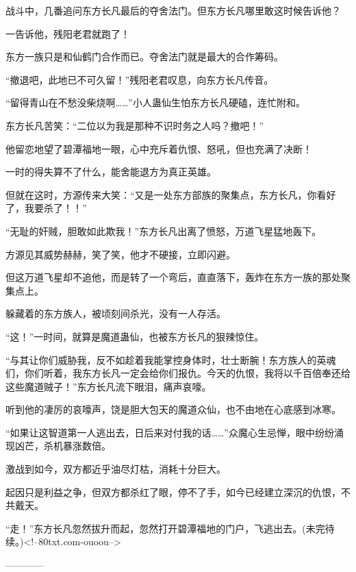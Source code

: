 \begin{this_body}
战斗中，几番追问东方长凡最后的夺舍法门。但东方长凡哪里敢这时候告诉他？

一告诉他，残阳老君就跑了！

东方一族只是和仙鹤门合作而已。夺舍法门就是最大的合作筹码。

“撤退吧，此地已不可久留！”残阳老君叹息，向东方长凡传音。

“留得青山在不愁没柴烧啊……”小人蛊仙生怕东方长凡硬磕，连忙附和。

东方长凡苦笑：“二位以为我是那种不识时务之人吗？撤吧！”

他留恋地望了碧潭福地一眼，心中充斥着仇恨、怒吼，但也充满了决断！

一时的得失算不了什么，能舍能退方为真正英雄。

但就在这时，方源传来大笑：“又是一处东方部族的聚集点，东方长凡，你看好了，我要杀了！！”

“无耻的奸贼，胆敢如此欺我！”东方长凡出离了愤怒，万道飞星猛地轰下。

方源见其威势赫赫，笑了笑，他才不硬接，立即闪避。

但这万道飞星却不追他，而是转了一个弯后，直直落下，轰炸在东方一族的那处聚集点上。

躲藏着的东方族人，被顷刻间杀光，没有一人存活。

“这！”一时间，就算是魔道蛊仙，也被东方长凡的狠辣惊住。

“与其让你们威胁我，反不如趁着我能掌控身体时，壮士断腕！东方族人的英魂们，你们听着，我东方长凡一定会给你们报仇。今天的仇恨，我将以千百倍奉还给这些魔道贼子！”东方长凡流下眼泪，痛声哀嚎。

听到他的凄厉的哀嚎声，饶是胆大包天的魔道众仙，也不由地在心底感到冰寒。

“如果让这智道第一人逃出去，日后来对付我的话……”众魔心生忌惮，眼中纷纷涌现凶芒，杀机暴涨数倍。

激战到如今，双方都近乎油尽灯枯，消耗十分巨大。

起因只是利益之争，但双方都杀红了眼，停不了手，如今已经建立深沉的仇恨，不共戴天。

“走！”东方长凡忽然拔升而起，忽然打开碧潭福地的门户，飞逃出去。(未完待续。)<!--80txt.com-ouoou-->

------------

\end{this_body}


